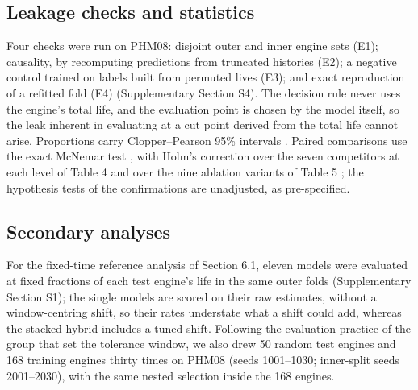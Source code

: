 \documentclass[a4paper,fleqn,doubleblind]{cas-dc}
\begin{document}
\subsection{Leakage checks and statistics}

Four checks were run on PHM08: disjoint outer and inner engine sets (E1); causality, by recomputing predictions from truncated histories (E2); a negative control trained on labels built from permuted lives (E3); and exact reproduction of a refitted fold (E4) (Supplementary Section S4). The decision rule never uses the engine's total life, and the evaluation point is chosen by the model itself, so the leak inherent in evaluating at a cut point derived from the total life cannot arise. Proportions carry Clopper--Pearson 95\% intervals \cite{clopper1934}. Paired comparisons use the exact McNemar test \cite{mcnemar1947}, with Holm's correction over the seven competitors at each level of Table 4 and over the nine ablation variants of Table 5 \cite{holm1979}; the hypothesis tests of the confirmations are unadjusted, as pre-specified.

\subsection{Secondary analyses}

For the fixed-time reference analysis of Section 6.1, eleven models were evaluated at fixed fractions of each test engine's life in the same outer folds (Supplementary Section S1); the single models are scored on their raw estimates, without a window-centring shift, so their rates understate what a shift could add, whereas the stacked hybrid includes a tuned shift. Following the evaluation practice of the group that set the tolerance window, we also drew 50 random test engines and 168 training engines thirty times on PHM08 (seeds 1001--1030; inner-split seeds 2001--2030), with the same nested selection inside the 168 engines.
\end{document}
